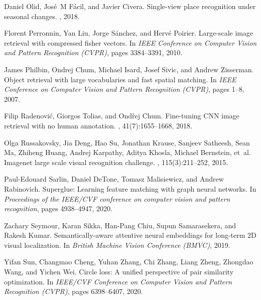 \documentclass{article}
\begin{document}
\begin{thebibliography}{99}
Daniel Olid, Jos{\'e}~M F{\'a}cil, and Javier Civera.
\newblock Single-view place recognition under seasonal changes.
, 2018.

Florent Perronnin, Yan Liu, Jorge S{\'a}nchez, and Herv{\'e} Poirier.
\newblock Large-scale image retrieval with compressed fisher vectors.
\newblock In {\em IEEE Conference on Computer Vision and Pattern Recognition
  (CVPR)}, pages 3384--3391, 2010.

James Philbin, Ondrej Chum, Michael Isard, Josef Sivic, and Andrew Zisserman.
\newblock Object retrieval with large vocabularies and fast spatial matching.
\newblock In {\em IEEE Conference on Computer Vision and Pattern Recognition
  (CVPR)}, pages 1--8, 2007.

Filip Radenovi{\'c}, Giorgos Tolias, and Ond{\v{r}}ej Chum.
\newblock Fine-tuning {CNN} image retrieval with no human annotation.
,
  41(7):1655--1668, 2018.

Olga Russakovsky, Jia Deng, Hao Su, Jonathan Krause, Sanjeev Satheesh, Sean Ma,
  Zhiheng Huang, Andrej Karpathy, Aditya Khosla, Michael Bernstein, et~al.
\newblock Imagenet large scale visual recognition challenge.
, 115(3):211--252,
  2015.

Paul-Edouard Sarlin, Daniel DeTone, Tomasz Malisiewicz, and Andrew Rabinovich.
\newblock Superglue: Learning feature matching with graph neural networks.
\newblock In {\em Proceedings of the IEEE/CVF conference on computer vision and
  pattern recognition}, pages 4938--4947, 2020.

Zachary Seymour, Karan Sikka, Han-Pang Chiu, Supun Samarasekera, and Rakesh
  Kumar.
\newblock Semantically-aware attentive neural embeddings for long-term {2D}
  visual localization.
\newblock In {\em British Machine Vision Conference (BMVC)}, 2019.

Yifan Sun, Changmao Cheng, Yuhan Zhang, Chi Zhang, Liang Zheng, Zhongdao Wang,
  and Yichen Wei.
\newblock Circle loss: A unified perspective of pair similarity optimization.
\newblock In {\em IEEE/CVF Conference on Computer Vision and Pattern
  Recognition (CVPR)}, pages 6398--6407, 2020.


\end{thebibliography}
\end{document}
